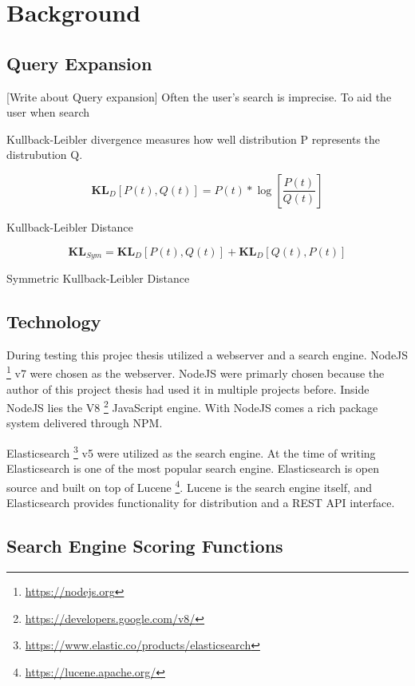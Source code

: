 \chapter{Background}
\section{Query Expansion}
[Write about Query expansion]
Often the user's search is imprecise.
To aid the user when search

Kullback-Leibler divergence measures how well distribution P represents the distrubution Q.


\begin{cequation}[H]
	\begin{equation}
	    \label{equ:line}
		\mathbf{KL}_D[P(t), Q(t)] = P(t)*\log{[\frac{P(t)}{Q(t)}]}
	\end{equation}
	\caption{Kullback-Leibler Distance}
  \label{kl-distance}
\end{cequation}

\begin{cequation}[H]
	\begin{equation}
	    \label{equ:line}
		\mathbf{KL}_{Sym} = \mathbf{KL}_D[P(t), Q(t)] + \mathbf{KL}_D[Q(t), P(t)]
	\end{equation}
	\caption{Symmetric Kullback-Leibler Distance}
  \label{kl-distance-sym}
\end{cequation}


\section{Technology}
During testing this projec thesis utilized a webserver and a search engine.
NodeJS \footnote{\url{https://nodejs.org}} v7 were chosen as the webserver.
NodeJS were primarly chosen because the author of this project thesis had used it in multiple projects before.
Inside NodeJS lies the V8 \footnote{\url{https://developers.google.com/v8/}} JavaScript engine.
With NodeJS comes a rich package system delivered through NPM.

Elasticsearch \footnote{\url{https://www.elastic.co/products/elasticsearch}} v5 were utilized as the search engine.
At the time of writing Elasticsearch is one of the most popular search engine.
Elasticsearch is open source and built on top of Lucene \footnote{\url{https://lucene.apache.org/}}.
Lucene is the search engine itself,
and Elasticsearch provides functionality for distribution and a REST API interface.

\section{Search Engine Scoring Functions}
